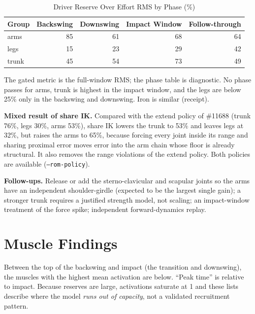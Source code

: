 \documentclass[11pt,a4paper]{article}
\begin{document}
\begin{table}[h]\centering\small
\caption{Driver Reserve Over Effort RMS by Phase (\%)}
\begin{tabular}{lrrrr}\toprule Group & Backswing & Downswing & Impact Window & Follow-through \\\midrule
arms & 85 & 61 & 68 & 64 \\
legs & 15 & 23 & 29 & 42 \\
trunk & 45 & 54 & 73 & 49 \\
\bottomrule\end{tabular}\end{table}
\noindent The gated metric is the full-window RMS; the phase table is diagnostic. No phase passes for arms, trunk is highest in the impact window, and the legs are below 25\% only in the backswing and downswing. Iron is similar (receipt).

\textbf{Mixed result of share IK.} Compared with the extend policy of \#11688 (trunk 76\%, legs 30\%, arms 53\%), share IK lowers the trunk to 53\% and leaves legs at 32\%, but raises the arms to 65\%, because forcing every joint inside its range and sharing proximal error moves error into the arm chain whose floor is already structural. It also removes the range violations of the extend policy. Both policies are available (\texttt{--rom-policy}).

\textbf{Follow-ups.} Release or add the sterno-clavicular and scapular joints so the arms have an independent shoulder-girdle (expected to be the largest single gain); a stronger trunk requires a justified strength model, not scaling; an impact-window treatment of the force spike; independent forward-dynamics replay.

\section{Muscle Findings}
Between the top of the backswing and impact (the transition and downswing), the muscles with the highest mean activation are below. ``Peak time'' is relative to impact. Because reserves are large, activations saturate at 1 and these lists describe where the model \emph{runs out of capacity}, not a validated recruitment pattern.
\end{document}
